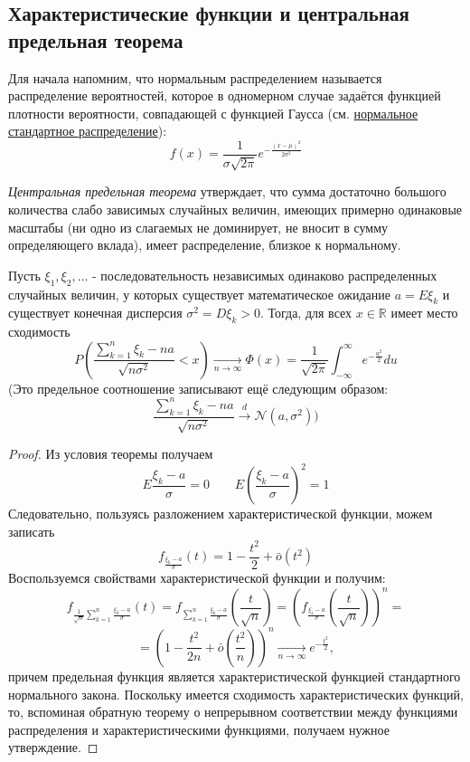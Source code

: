 \subsection{Характеристические функции и центральная предельная теорема}

Для начала напомним, что нормальным распределением называется распределение вероятностей, которое в одномерном случае задаётся функцией плотности вероятности, совпадающей с функцией Гаусса (см. \hyperlink{normal_distribution}{нормальное стандартное распределение}):
\[ f(x) = \frac{1}{\sigma \sqrt{2 \pi}} e^{- \frac{(x - \mu)^2}{2 \sigma^2}} \]

\textit{Центральная предельная теорема} утверждает, что сумма достаточно большого количества слабо зависимых случайных величин, имеющих примерно одинаковые масштабы (ни одно из слагаемых не доминирует, не вносит в сумму определяющего вклада), имеет распределение, близкое к нормальному.

\begin{theorem}
	Пусть $\xi_1, \xi_2, \dots$ - последовательность независимых одинаково распределенных случайных величин, у которых существует математическое ожидание $a = E\xi_k$ и существует конечная дисперсия $\sigma^2 = D\xi_k > 0$. Тогда, для всех $x \in \mathbb{R}$ имеет место сходимость
	\[ P \left( \frac{\sum\limits_{k=1}^{n} \xi_k - na}{\sqrt{n \sigma^2}} < x \right) \underset{n \to \infty}{\to} \Phi (x) = \frac{1}{\sqrt{2 \pi}} \int_{- \infty}^{\infty} e^{- \frac{u^2}{2}}du \]
	(Это предельное соотношение записывают ещё следующим образом:
	\[ \frac{\sum\limits_{k=1}^{n} \xi_k - na}{\sqrt{n \sigma^2}} \overset{d}{\to} \mathcal{N} (a, \sigma^2) ) \]
\end{theorem}

\begin{proof}
	Из условия теоремы получаем
	\[ E \frac{\xi_k - a}{\sigma} = 0 ~~~~~~~~~ E \left( \frac{\xi_k - a}{\sigma} \right)^2 = 1 \]
	Следовательно, пользуясь разложением характеристической функции, можем записать
	\[ f_{\frac{\xi_{k}-a}{\sigma}} (t) = 1 - \frac{t^2}{2} + \bar{o} (t^2) \]
	Воспользуемся свойствами характеристической функции и получим:
	\[ f_{\frac{1}{\sqrt{n}} \sum\limits_{k=1}^{n} \frac{\xi_k - a}{\sigma}} (t) = f_{\sum\limits_{k=1}^{n} \frac{\xi_k - a}{\sigma}} \left( \frac{t}{\sqrt{n}} \right) = \left( f_{\frac{\xi_1 - a}{\sigma}} \left( \frac{t}{\sqrt{n}} \right) \right)^n = \]
	\[ = \left( 1 - \frac{t^2}{2n} + \bar{o} \left( \frac{t^2}{n} \right) \right)^n \underset{n \to \infty}{\to} e^{- \frac{t^2}{2}}, \]
	причем предельная функция является характеристической функцией стандартного нормального закона. Поскольку имеется сходимость характеристических функций, то, вспоминая обратную теорему о непрерывном соответствии между функциями распределения и характеристическими функциями, получаем нужное утверждение.
\end{proof}

